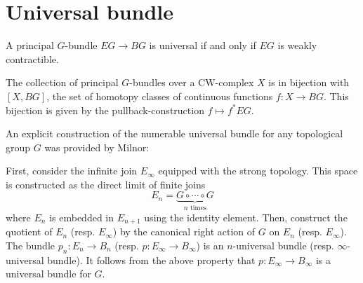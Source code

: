 \section{Universal bundle}

    \begin{property}
        A principal $G$-bundle $EG\rightarrow BG$ is universal if and only if $EG$ is weakly contractible.
    \end{property}

    \begin{property}[Classification]\label{diff:prin:classification}
        The collection of principal $G$-bundles over a CW-complex $X$ is in bijection with $[X, BG]$, the set of homotopy classes of continuous functions $f:X\rightarrow BG$. This bijection is given by the pullback-construction $f\mapsto f^*EG$.
    \end{property}


    An explicit construction of the numerable universal bundle for any topological group $G$ was provided by Milnor:
    \begin{construct}[Milnor]
        First, consider the infinite join $E_\infty$ equipped with the strong topology. This space is constructed as the direct limit of finite joins \[E_n=\underbrace{G\circ\cdots\circ G}_{n\text{ times}}\] where $E_n$ is embedded in $E_{n+1}$ using the identity element. Then, construct the quotient of $E_n$ (resp. $E_\infty$) by the canonical right action of $G$ on $E_n$ (resp. $E_\infty$). The bundle $p_n:E_n\rightarrow B_n$ (resp. $p:E_\infty\rightarrow B_\infty$) is an $n$-universal bundle (resp. $\infty$-universal bundle). It follows from the above property that $p:E_\infty\rightarrow B_\infty$ is a universal bundle for $G$.
    \end{construct}